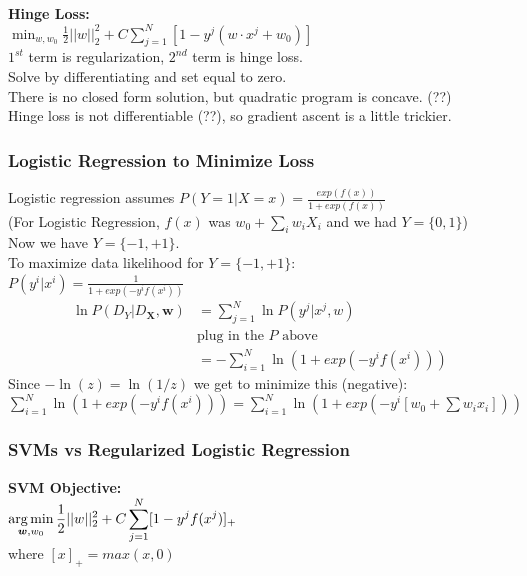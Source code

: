 \textbf{Hinge Loss:}  \hfill \\
$\displaystyle \min_{w, w_0} \frac{1}{2} ||w||_2^2 + C \sum_{j=1}^N [1 - y^j(w \cdot x^j + w_0)]$ \hfill \\
$1^{st}$ term is regularization, $2^{nd}$ term is hinge loss.  \hfill \\
Solve by differentiating and set equal to zero.  \hfill \\
There is no closed form solution, but quadratic program is concave.  (??)   \hfill \\
Hinge loss is not differentiable (??), so gradient ascent is a little trickier.  \hfill \\

\subsubsection{Logistic Regression to Minimize Loss}
Logistic regression assumes $P(Y=1 | X=x) = \frac{exp(f(x))}{1 + exp(f(x))}$  \hfill \\
(For Logistic Regression, $f(x)$ was $w_0 + \sum_i w_i X_i$ and we had $Y = \{0, 1\}$)  \hfill \\
Now we have $Y = \{ -1, +1 \}$.  \hfill \\
To maximize data likelihood for $Y = \{ -1, +1 \}$: \hfill \\
$\displaystyle  P(y^i | x^i) = \frac{1}{1 + exp(-y^i f(x^i))}$ \hfill \\
\begin{align*}
	\ln P(D_Y | D_{\bm{X}}, \bm{w}) &= \sum_{j=1}^N \ln P(y^j | x^j, w) \\ 
		& \mbox{plug in the $P$ above} \\
		&= - \sum_{i=1}^N \ln(1 + exp(-y^i f(x^i)))
\end{align*}
Since $-\ln(z) = \ln(1/z)$ we get to minimize this (negative):   \hfill \\
$\displaystyle  \sum_{i=1}^N \ln(1 + exp(-y^i f(x^i))) =  \sum_{i=1}^N \ln(1 + exp(-y^i [w_0 + \sum w_i x_i]))$

\subsubsection{SVMs vs Regularized Logistic Regression}
\textbf{SVM Objective:} \hfill \\
$\displaystyle \operatorname*{arg\,min}_{\bm{w}, w_0} \frac{1}{2} ||w||_2^2 + C \sum_{j=1}^N [1 - y^j f(x^j)]_+$ \hfill \\
where $[x]_+ = max(x , 0)$ \hfill \\
 \hfill \\

